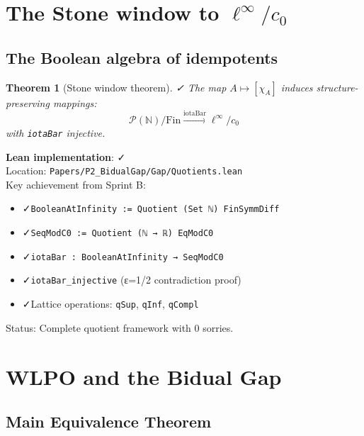 \documentclass[11pt]{article}
\newtheorem{theorem}{Theorem}[section]
\theoremstyle{definition}
\theoremstyle{remark}
\newcommand{\leanok}{\textcolor{green!70!black}{✓}}
\newcommand{\leanloc}[1]{\texttt{\footnotesize\color{blue!60!black}#1}}
\newcommand{\N}{\mathbb{N}}
\newcommand{\cnull}{c_0}
\newcommand{\linf}{\ell^\infty}
\begin{document}
\section{The Stone window to \texorpdfstring{$\ell^\infty/c_0$}{l-infinity/c-0}}\label{sec:stone}

\subsection{The Boolean algebra of idempotents}

\begin{theorem}[Stone window theorem]\label{thm:stone-window} \leanok
The map \(A\mapsto[\chi_A]\) induces structure-preserving mappings:
\[
  \mathcal{P}(\N)/\mathrm{Fin} \xrightarrow{\text{iotaBar}} \linf/\cnull
\]
with \texttt{iotaBar} injective.
\end{theorem}

\begin{mdframed}[style=okbox]
\textbf{Lean implementation}: \leanok\\
Location: \leanloc{Papers/P2\_BidualGap/Gap/Quotients.lean}\\
Key achievement from Sprint B:
\begin{itemize}
\item \leanok \texttt{BooleanAtInfinity := Quotient (Set ℕ) FinSymmDiff}
\item \leanok \texttt{SeqModC0 := Quotient (ℕ → ℝ) EqModC0}
\item \leanok \texttt{iotaBar : BooleanAtInfinity → SeqModC0}
\item \leanok \texttt{iotaBar\_injective} (ε=1/2 contradiction proof)
\item \leanok Lattice operations: \texttt{qSup}, \texttt{qInf}, \texttt{qCompl}
\end{itemize}
Status: Complete quotient framework with 0 sorries.
\end{mdframed}

\section{WLPO and the Bidual Gap}\label{sec:wlpo-gap}

\subsection{Main Equivalence Theorem}
\end{document}
